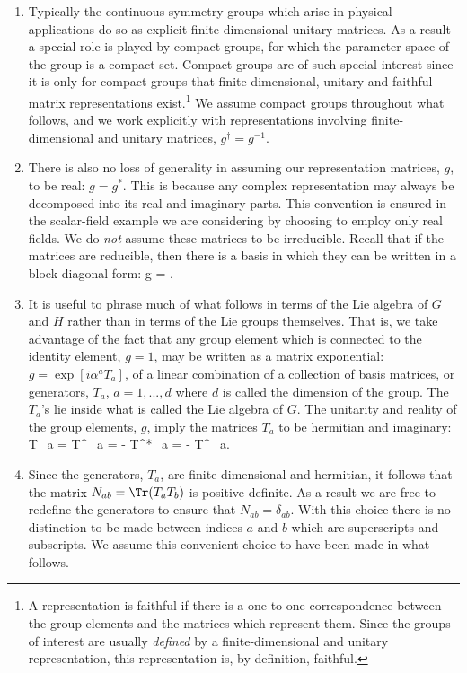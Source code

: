 \documentclass[12pt]{report}
\begin{document}
\begin{enumerate}

\item
Typically the continuous symmetry groups which arise in
physical applications do so as explicit finite-dimensional
unitary matrices. As a result a special role is played by
compact groups, for which the parameter space of the group
is a compact set. Compact groups are of such special
interest since it is only for compact groups that
finite-dimensional, unitary and faithful matrix
representations exist.\footnote{A representation is
faithful if there is a one-to-one correspondence between
the group elements and the matrices which represent them.
Since the groups of interest are usually {\em defined} by a
finite-dimensional and unitary representation, this
representation is, by definition, faithful.} We assume
compact groups throughout what follows, and we work
explicitly with representations involving
finite-dimensional and unitary matrices, $g^\dagger =
g^{-1}$.

\item
There is also no loss of generality in assuming our
representation matrices, $g$, to be real: $g = g^*$. This
is because any complex representation may always be
decomposed into its real and imaginary parts. This
convention is ensured in the scalar-field example we are
considering by choosing to employ only real fields. We do
{\em not} assume these matrices to be irreducible. 
Recall that if the matrices are reducible, then 
there is a basis in which they can be written in a 
block-diagonal form:
%
\eq
\label{reducibledef}
g = . 
\eeq

\item
It is useful to phrase much of what follows in terms of the
Lie algebra of $G$ and $H$ rather than in terms of the Lie
groups themselves. That is, we take advantage of the fact
that any group element which is connected to the identity
element, $g = 1$, may be written as a matrix exponential:
$g = \exp \left[ i \alpha^a T_a 
\right]$, of a linear combination of a collection of basis
matrices, or generators, $T_a$, $a = 1,...,d$ where $d$ is
called the dimension of the group. The $T_a$'s lie inside
what is called the Lie algebra of $G$. The unitarity and
reality of the group elements, $g$, imply the matrices
$T_a$ to be hermitian and imaginary:
%
\eq
\label{whatthetssatisfy}
T_a = T^\dagger_a = - T^*_a = - T^\sst_a. \eeq

\item
Since the generators, $T_a$, are finite dimensional and
hermitian, it follows that the matrix $N_{ab} = \Tr(T_a
T_b)$ is positive definite. As a result we are free to
redefine the generators to ensure that $N_{ab} =
\delta_{ab}$. With this choice there is no distinction to
be made between indices $a$ and $b$ which are superscripts
and subscripts. We assume this convenient choice to have
been made in what follows.


\end{enumerate}
\end{document}
